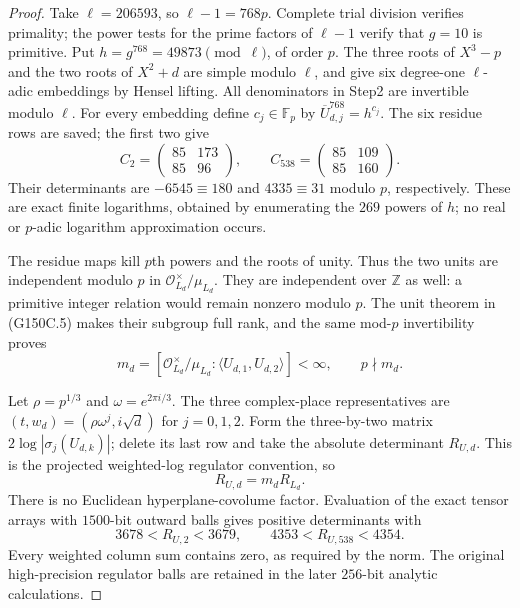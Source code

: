 \begin{proof}
Take $\ell=206593$, so $\ell-1=768p$.
Complete trial division verifies primality; the power tests for
the prime factors of $\ell-1$ verify that $g=10$ is primitive.
Put $h=g^{768}=49873\pmod\ell$, of order $p$.
The three roots of $X^3-p$ and the two roots of $X^2+d$ are
simple modulo $\ell$, and give six degree-one $\ell$-adic
embeddings by Hensel lifting.
All denominators in Step2 are invertible modulo $\ell$.
For every embedding define $c_j\in\mathbb F_p$ by
$\overline{U}_{d,j}^{768}=h^{c_j}$.
The six residue rows are saved; the first two give
\[
 C_2=\begin{pmatrix}85&173\\85&96\end{pmatrix},\qquad
 C_{538}=\begin{pmatrix}85&109\\85&160\end{pmatrix}.
 \tag{G150C.11}
\]
Their determinants are $-6545\equiv180$ and $4335\equiv31$
modulo $p$, respectively.
These are exact finite logarithms, obtained by enumerating the
$269$ powers of $h$; no real or $p$-adic logarithm approximation occurs.

The residue maps kill $p$th powers and the roots of unity.
Thus the two units are independent modulo $p$ in
$\mathcal O_{L_d}^{\times}/\mu_{L_d}$.
They are independent over $\mathbb Z$ as well: a primitive
integer relation would remain nonzero modulo $p$.
The unit theorem in (G150C.5) makes their subgroup full rank,
and the same mod-$p$ invertibility proves
\[
 m_d=[\mathcal O_{L_d}^{\times}/\mu_{L_d}:
             \langle U_{d,1},U_{d,2}\rangle]<\infty,
                    \qquad p\nmid m_d.
 \tag{G150C.12}
\]

Let $\rho=p^{1/3}$ and $\omega=e^{2\pi i/3}$.
The three complex-place representatives are
$(t,w_d)=(\rho\omega^j,i\sqrt d)$ for $j=0,1,2$.
Form the three-by-two matrix $2\log|\sigma_j(U_{d,k})|$;
delete its last row and take the absolute determinant $R_{U,d}$.
This is the projected weighted-log regulator convention, so
\[
                         R_{U,d}=m_dR_{L_d}.
 \tag{G150C.13}
\]
There is no Euclidean hyperplane-covolume factor.
Evaluation of the exact tensor arrays with $1500$-bit outward
balls gives positive determinants with
\[
 3678<R_{U,2}<3679,\qquad 4353<R_{U,538}<4354.
 \tag{G150C.14}
\]
Every weighted column sum contains zero, as required by the norm.
The original high-precision regulator balls are retained in the
later $256$-bit analytic calculations.


\end{proof}
